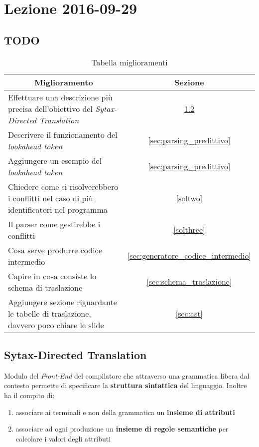 \section{Lezione 2016-09-29}
\subsection{TODO}
\begin{table}[ht]
\begin{center}
\begin{tabular}{|p{\textwidth}|c|}
\hline
\multicolumn{1}{|c|}{\textbf{Miglioramento}} & \textbf{Sezione} \\ \hline
Effettuare una descrizione più precisa dell'obiettivo del
\textit{Sytax-Directed Translation} &
\ref{sec:syntax-directed_translation}\\ \hline
Descrivere il funzionamento del \textit{lookahead token} &
\ref{sec:parsing_predittivo} \\ \hline
Aggiungere un esempio del \textit{lookahead token} &
\ref{sec:parsing_predittivo} \\ \hline
Chiedere come si risolverebbero i conflitti nel caso di più identificatori nel
programma & \ref{soltwo} \\ \hline
Il parser come gestirebbe i conflitti & \ref{solthree} \\ \hline
Cosa serve produrre codice intermedio
& \ref{sec:generatore_codice_intermedio} \\ \hline
Capire in cosa consiste lo schema di traslazione &
\ref{sec:schema_traslazione} \\ \hline
Aggiungere sezione riguardante le tabelle di traslazione, davvero poco chiare
le slide & \ref{sec:ast} \\ \hline
\end{tabular}
\end{center}
\caption{Tabella miglioramenti}
\label{tab:tab_todo}
\end{table}

\subsection{Sytax-Directed Translation}
\label{sec:syntax-directed_translation}
Modulo del \textit{Front-End} del compilatore che attraverso una grammatica
libera dal contesto permette di specificare la \textbf{struttura sintattica} del
linguaggio. Inoltre ha il compito di:
\begin{enumerate}
\item associare ai terminali e non della grammatica un \textbf{insieme di
attributi}
\item associare ad ogni produzione un \textbf{insieme di regole semantiche} per
calcolare i valori degli attributi
\end{enumerate}

